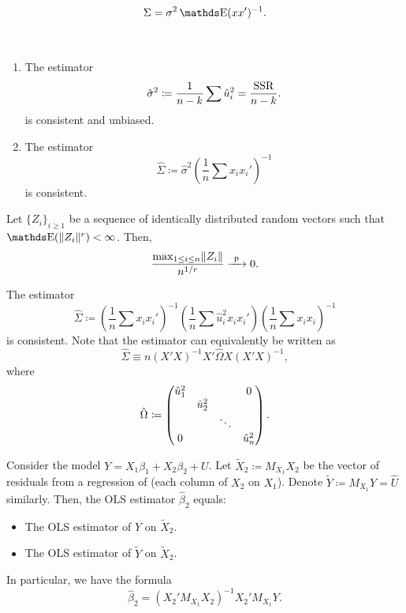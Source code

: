 \begin{proposition}
  \[
    \Sigma = \sigma^2 \E(x x')^{-1}.
  \]
\end{proposition}

\begin{proposition}~
  \begin{enumerate}[label=(\roman*)]
    \item %
      The estimator
      \[
        \hat{\sigma}^2 \coloneqq \frac{1}{n - k} \sum \hat{u}_i^2 = \frac{\operatorname{SSR}}{n - k}.
      \]
      is consistent and unbiased.
    \item %
      The estimator
      \[
        \hat{\Sigma} \coloneqq \hat{\sigma}^2 \left( \frac{1}{n} \sum x_i x_i' \right)^{-1}
      \]
      is consistent.
  \end{enumerate}
\end{proposition}

\begin{lemma}
  Let \(\{Z_i\}_{i \geq 1}\) be a sequence of identically distributed random vectors such that \(\E(\norm{Z_i}^r) < \infty\).
  Then,
  \[
    \frac{\max_{1 \leq i \leq n} \lVert Z_i\rVert}{n^{1 / r}}
    \xrightarrow{\ \mathrm{p}\ } 0.
  \]
\end{lemma}

\begin{proposition}
  The estimator
  \[
    \hat{\Sigma}
    \coloneqq \left( \frac{1}{n} \sum x_i x_i' \right)^{-1} \left( \frac{1}{n} \sum \hat{u}_i^2 x_i x_i' \right) \left( \frac{1}{n} \sum x_i x_i \right)^{-1}
  \]
  is consistent.
  Note that the estimator can equivalently be written as
  \[
    \hat{\Sigma}
    \equiv n (X' X)^{-1} X' \hat{\Omega} X (X' X)^{-1},
  \]
  where
  \[
    \hat{\Omega} \coloneqq \begin{pmatrix}
      \hat{u}_1^2 &  &  & 0 \\
       & \hat{u}_2^2 &  &  \\
       &  & \ddots &  \\
      0 &  &  & \hat{u}_n^2
    \end{pmatrix}.
  \]
\end{proposition}

\begin{proposition}
  Consider the model \(Y = X_1 \beta_1 + X_2 \beta_2 + U\).
  Let \(\tilde{X}_2 \coloneqq M_{X_1} X_2\) be the vector of residuals from a regression of (each column of \(X_2\) on \(X_1\)).
  Denote \(\tilde{Y} \coloneqq M_{X_1} Y = \hat{U}\) similarly.
  Then, the OLS estimator \(\hat{\beta}_2\) equals:
  \begin{itemize}
    \item The OLS estimator of \(Y\) on \(\tilde{X}_2\).
    \item The OLS estimator of \(\tilde{Y}\) on \(\tilde{X}_2\).
  \end{itemize}
  In particular, we have the formula
  \[
    \hat{\beta}_2
    = (X_2' M_{X_1} X_2)^{-1} X_2' M_{X_1} Y.
  \]
\end{proposition}


